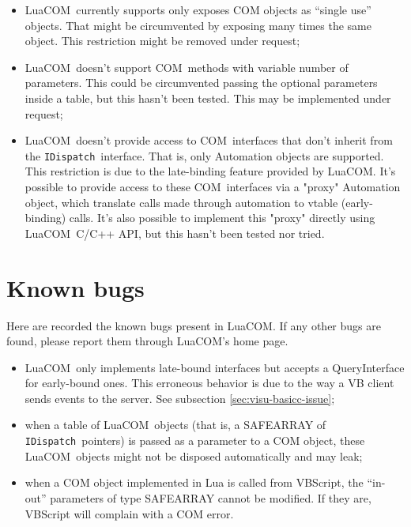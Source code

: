 \documentclass[11pt,a4paper,english]{report}
\newcommand{\ident}[1]{\mbox{\texttt{#1}}}
\newcommand{\techname}[1]{\mbox{#1}}
\newcommand{\com}{\techname{COM}}
\newcommand{\luacom}{\techname{LuaCOM}}
\newcommand{\idispatch}{\ident{IDispatch}}
\begin{document}
\begin{itemize}

\item \luacom\ currently supports only exposes COM objects as ``single
use'' objects. That might be circumvented by exposing many times the
same object. This restriction might be removed under request;

\item \luacom\ doesn't support \com\ methods with variable number of
parameters. This could be circumvented passing the optional parameters
inside a table, but this hasn't been tested. This may be implemented
under request;

\item \luacom\ doesn't provide access to \com\ interfaces that don't
inherit from the \idispatch\ interface. That is, only Automation objects
are supported. This restriction is due to the late-binding feature
provided by \luacom. It's possible to provide access to these \com\
interfaces via a "proxy" Automation object, which translate calls made
through automation to vtable (early-binding) calls. It's also possible
to implement this "proxy" directly using \luacom\ C/C++ API, but this
hasn't been tested nor tried.

\end{itemize}


\section{Known bugs}
\label{sect:bugs}
Here are recorded the known bugs present in \luacom. If any other bugs
are found, please report them through \luacom's home page.

\begin{itemize}

\item \luacom\ only implements late-bound interfaces but accepts a
QueryInterface for early-bound ones. This erroneous behavior is due
to the way a VB client sends events to the server. See subsection
\ref{sec:visu-basicc-issue};

\item when a table of \luacom\ objects (that is, a SAFEARRAY of
\idispatch\ pointers) is passed as a parameter to a COM object, these
\luacom\ objects might not be disposed automatically and may leak;

\item when a COM object implemented in Lua is called from VBScript,
the ``in-out'' parameters of type SAFEARRAY cannot be modified. If
they are, VBScript will complain with a COM error.

\end{itemize}
\end{document}
